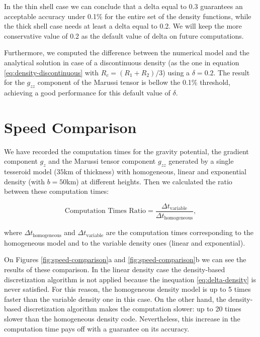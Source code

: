 \documentclass[extra]{gji}
\begin{document}
In the thin shell case we can conclude that a delta equal to 0.3 guarantees an acceptable accuracy under 0.1\% for the entire set of the density functions, while the thick shell case needs at least a delta equal to 0.2.
We will keep the more conservative value of 0.2 as the default value of delta on future computations.

Furthermore, we computed the difference between the numerical model and the analytical solution in case of a discontinuous density (as the one in equation \ref{eq:density-discontinuous} with $R_c = (R_1 + R_2)/3$) using a $\delta = 0.2$.
The result for the $g_{zz}$ component of the Marussi tensor is bellow the 0.1\% threshold, achieving a good performance for this default value of $\delta$.



\section{Speed Comparison}

We have recorded the computation times for the gravity potential, the gradient component $g_z$ and the Marussi tensor component $g_{zz}$ generated by a single tesseroid model ($35$km of thickness) with homogeneous, linear and exponential density (with $b=50$km) at different heights. Then we calculated the ratio between these computation times:

\begin{equation}
    \text{Computation Times Ratio} =
        \frac{\Delta t_\text{variable}}{\Delta t_\text{homogeneous}},
    \label{eq:computation-times-ratio}
\end{equation}

\noindent where $\Delta t_\text{homogeneous}$ and $\Delta t_\text{variable}$ are the computation times corresponding to the homogeneous model and to the variable density ones (linear and exponential).

On Figures \ref{fig:speed-comparison}a and \ref{fig:speed-comparison}b we can see the results of these comparison.
In the linear density case the density-based discretization algorithm is not applied because the inequation \ref{eq:delta-density} is never satisfied.
For this reason, the homogeneous density model is up to 5 times faster than the variable density one in this case.
On the other hand, the density-based discretization algorithm makes the computation slower: up to 20 times slower than the homogeneous density code.
Nevertheless, this increase in the computation time pays off with a guarantee on its accuracy.
\end{document}
